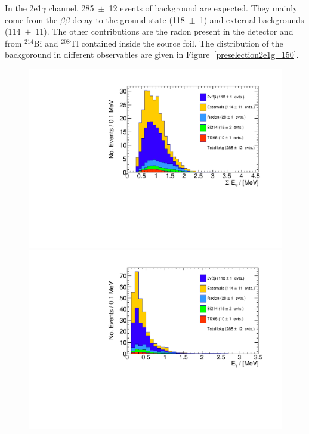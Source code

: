\documentclass[main.tex]{subfiles}
\begin{document}
\NI In the 2e1$\gamma$ channel, 285~$\pm$~12 events of background are expected. They mainly come from the $\beta\beta$ decay to the ground state (118~$\pm$~1) and external backgrounds (114~$\pm$~11). The other contributions are the radon present in the detector and from $^{\text{214}}$Bi and $^{\text{208}}$Tl contained inside the source foil. The distribution of the backgoround in different observables are given in Figure~\ref{preselection2e1g_150}.


\begin{figure}[h!]
\centering
\includegraphics[scale=0.35]{pictures/FinalResults/bb2nu2/150/preselection/preSelection2e1gBKG_tot_e_energy.pdf}
\includegraphics[scale=0.35]{pictures/FinalResults/bb2nu2/150/preselection/preSelection2e1gBKG_gmc_energy.pdf}

\end{figure}
\end{document}
